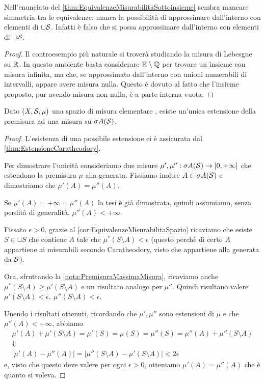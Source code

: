 \begin{remark}
	Nell'enunciato del \cref{thm:EquivalenzeMisurabilitaSottoinsieme} sembra mancare simmetria tra le equivalenze: manca la possibilità di approssimare dall'interno con elementi di $\sqcup\S$. Infatti è falso che si possa approssimare dall'interno con elementi di $\sqcup\S$.
\end{remark}
\begin{proof}
	Il controesempio più naturale si troverà studiando la misura di Lebesgue su $\R$. In questo ambiente basta considerare $\R\setminus\mathbb Q$ per trovare un insieme con misura infinita, ma che, se approssimato dall'interno con unioni numerabili di intervalli, appare avere misura nulla. Questo è dovuto al fatto che l'insieme proposto, pur avendo misura non nulla, è a parte interna vuota.
\end{proof}




\begin{proposition}\label{prop:UnicitaCaratheodory}
	Dato $(X,\S,\mu)$ una spazio di misura elementare \sigfin[o], esiste un'unica estensione della premisura ad una misura su $\sigma A(\S)$.
\end{proposition}
\begin{proof}
	L'esistenza di una possibile estensione ci è assicurata dal \cref{thm:EstensioneCaratheodory}.
	
	Per dimostrare l'unicità consideriamo due misure $\mu',\mu'':\sigma A(\S)\to\Rpiu$ che estendono la premisura $\mu$ alla \sigalg{} generata. Fissiamo inoltre $A\in\sigma A(\S)$ e dimostriamo che $\mu'(A)=\mu''(A)$.
	
	Se $\mu'(A)=+\infty=\mu''(A)$ la tesi è già dimostrata,  quindi assumiamo, senza perdità di generalità, $\mu''(A)<+\infty$.
	
	Fissato $\epsilon>0$, grazie al \cref{cor:EquivalenzeMisurabilitaSpazio} ricaviamo che esiste $S\in\sqcup S$ che contiene $A$ tale che $\mu^*(S\setminus A)< \epsilon$ (questo perchè di certo $A$ appartiene ai misurabili secondo Caratheodory, visto che appartiene alla \sigalg{} generata da $\S$).
	
	Ora, sfruttando la \cref{nota:PremisuraMassimaMisura}, ricaviamo anche $\mu^*(S\setminus A)\ge\mu'(S\setminus A)$ e un risultato analogo per $\mu''$. Quindi risultano valere $\mu'(S\setminus A)<\epsilon,\ \mu''(S\setminus A)<\epsilon$.
	
	Unendo i risultati ottenuti, ricordando che $\mu',\mu''$ sono estensioni di $\mu$ e che $\mu''(A)<+\infty$,  abbiamo
	\begin{gather*}
		\mu'(A)+\mu'(S\setminus A)=\mu'(S)=\mu(S)=\mu''(S)=\mu''(A)+\mu''(S\setminus A) \\
		\Downarrow \\
		\lvert\mu'(A)-\mu''(A)\rvert=\lvert\mu''(S\setminus A)-\mu'(S\setminus A)\rvert<2\epsilon
	\end{gather*}
	e, visto che questo deve valere per ogni $\epsilon>0$, otteniamo $\mu'(A)=\mu''(A)$ che è quanto si voleva.
\end{proof}

